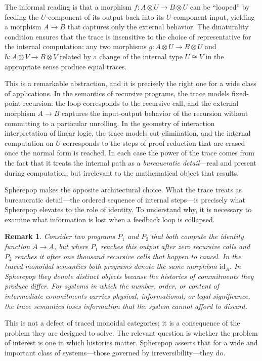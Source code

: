 \documentclass[12pt]{article}
\newtheorem{remark}{Remark}[section]
\begin{document}
The informal reading is that a morphism $f : A \otimes U \to B \otimes U$ can be ``looped'' by feeding the $U$-component of its output back into its $U$-component input, yielding a morphism $A \to B$ that captures only the external behavior. The dinaturality condition ensures that the trace is insensitive to the choice of representative for the internal computation: any two morphisms $g : A \otimes U \to B \otimes U$ and $h : A \otimes V \to B \otimes V$ related by a change of the internal type $U \cong V$ in the appropriate sense produce equal traces.

This is a remarkable abstraction, and it is precisely the right one for a wide class of applications. In the semantics of recursive programs, the trace models fixed-point recursion: the loop corresponds to the recursive call, and the external morphism $A \to B$ captures the input-output behavior of the recursion without committing to a particular unrolling. In the geometry of interaction interpretation of linear logic, the trace models cut-elimination, and the internal computation on $U$ corresponds to the steps of proof reduction that are erased once the normal form is reached. In each case the power of the trace comes from the fact that it treats the internal path as a \emph{bureaucratic detail}---real and present during computation, but irrelevant to the mathematical object that results.

Spherepop makes the opposite architectural choice. What the trace treats as bureaucratic detail---the ordered sequence of internal steps---is precisely what Spherepop elevates to the role of identity. To understand why, it is necessary to examine what information is lost when a feedback loop is collapsed.

\begin{remark}
Consider two programs $P_1$ and $P_2$ that both compute the identity function $A \to A$, but where $P_1$ reaches this output after zero recursive calls and $P_2$ reaches it after one thousand recursive calls that happen to cancel. In the traced monoidal semantics both programs denote the same morphism $\mathrm{id}_A$. In Spherepop they denote distinct objects because the histories of commitments they produce differ. For systems in which the number, order, or content of intermediate commitments carries physical, informational, or legal significance, the trace semantics loses information that the system cannot afford to discard.
\end{remark}

This is not a defect of traced monoidal categories; it is a consequence of the problem they are designed to solve. The relevant question is whether the problem of interest is one in which histories matter. Spherepop asserts that for a wide and important class of systems---those governed by irreversibility---they do.
\end{document}
